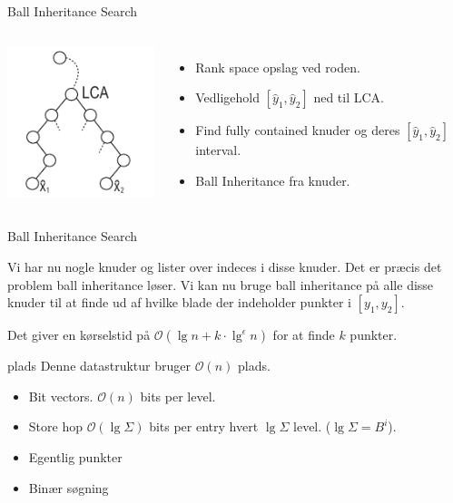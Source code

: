 \documentclass[pdf]{beamer}
\begin{document}
\begin{frame}{Ball Inheritance Search}
  \begin{center}
    \begin{columns}
        \includegraphics[scale=1.5]{pictures/BIS.pdf}
        \begin{itemize}
          \item Rank space opslag ved roden.
          \item Vedligehold $[\hat{y}_1, \hat{y}_2]$ ned til LCA.
          \item Find fully contained knuder og deres $[\hat{y}_1, \hat{y}_2]$ interval.
          \item Ball Inheritance fra knuder.
        \end{itemize}
      \end{columns}
  \end{center}
\end{frame}

\begin{frame}{Ball Inheritance Search}

  Vi har nu nogle knuder og lister over indeces i disse knuder. Det er præcis det problem ball inheritance løser. Vi kan nu bruge ball inheritance på alle disse knuder til at finde ud af hvilke blade der indeholder punkter i $[y_1, y_2]$.

  Det giver en kørselstid på $\mathcal{O}(\lg n + k\cdot\lg^\epsilon n)$ for at finde $k$ punkter.

\end{frame}

\begin{frame}{plads}
  Denne datastruktur bruger $\mathcal{O}(n)$ plads.
  \begin{itemize}
    \item Bit vectors. $\mathcal{O}(n)$ bits per level.
      \pause
    \item Store hop $\mathcal{O}(\lg \Sigma)$ bits per entry hvert $\lg \Sigma$ level. ($\lg \Sigma = B^i$).
      \pause
    \item Egentlig punkter
      \pause
    \item Binær søgning
  \end{itemize}
\end{frame}
\end{document}
